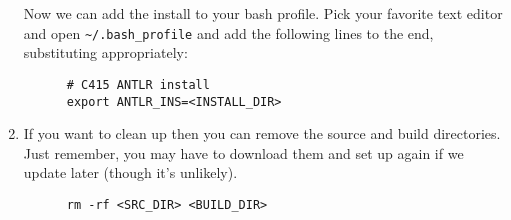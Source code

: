 \documentclass[../setup.tex]{subfiles}
\begin{document}
\begin{enumerate}
    Now we can add the install to your bash profile. Pick your favorite text editor and open
    \lstinline{~/.bash_profile} and add the following lines to the end, substituting appropriately:
    \begin{lstlisting}
      # C415 ANTLR install
      export ANTLR_INS=<INSTALL_DIR>
    \end{lstlisting}
  \item
    If you want to clean up then you can remove the source and build directories. Just remember,
    you may have to download them and set up again if we update later (though it's unlikely).
    \begin{lstlisting}
      rm -rf <SRC_DIR> <BUILD_DIR>
    \end{lstlisting}
\end{enumerate}
\end{document}
